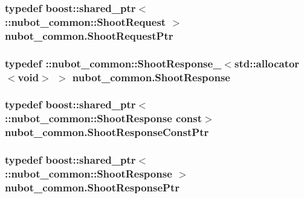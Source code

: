 \hypertarget{namespacenubot__common_ac26df14be5ca8158accd2be7a5532c3f}{
\subsubsection[{Shoot\-Request\-Ptr}]{\setlength{\rightskip}{0pt plus 5cm}typedef boost\-::shared\-\_\-ptr$<$ \-::{\bf nubot\-\_\-common\-::\-Shoot\-Request} $>$ {\bf nubot\-\_\-common.\-Shoot\-Request\-Ptr}}}\label{namespacenubot__common_ac26df14be5ca8158accd2be7a5532c3f}
\hypertarget{namespacenubot__common_a1561f4f368f1842d112eda1c185772d4}{
\subsubsection[{Shoot\-Response}]{\setlength{\rightskip}{0pt plus 5cm}typedef \-::{\bf nubot\-\_\-common\-::\-Shoot\-Response\-\_\-}$<$std\-::allocator$<$void$>$ $>$ {\bf nubot\-\_\-common.\-Shoot\-Response}}}\label{namespacenubot__common_a1561f4f368f1842d112eda1c185772d4}
\hypertarget{namespacenubot__common_a7b99346b603c3c2c580db63c98d0f816}{
\subsubsection[{Shoot\-Response\-Const\-Ptr}]{\setlength{\rightskip}{0pt plus 5cm}typedef boost\-::shared\-\_\-ptr$<$ \-::{\bf nubot\-\_\-common\-::\-Shoot\-Response} const$>$ {\bf nubot\-\_\-common.\-Shoot\-Response\-Const\-Ptr}}}\label{namespacenubot__common_a7b99346b603c3c2c580db63c98d0f816}
\hypertarget{namespacenubot__common_a93dfc1246b6d9c0f280764c96dd91d06}{
\subsubsection[{Shoot\-Response\-Ptr}]{\setlength{\rightskip}{0pt plus 5cm}typedef boost\-::shared\-\_\-ptr$<$ \-::{\bf nubot\-\_\-common\-::\-Shoot\-Response} $>$ {\bf nubot\-\_\-common.\-Shoot\-Response\-Ptr}}}\label{namespacenubot__common_a93dfc1246b6d9c0f280764c96dd91d06}
